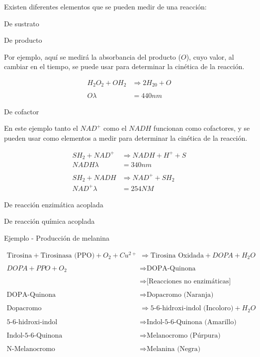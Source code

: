 Existen diferentes elementos que se pueden medir de una reacción:

De sustrato

De producto

Por ejemplo, aquí se medirá la absorbancia del producto ($O$), cuyo valor, al cambiar en el tiempo, se puede usar para determinar la cinética de la reacción.
 
\begin{align}
    H_2O_2 + OH_2 &\Longrightarrow 2H_20 + O
    \\
    \\
    O \lambda &= 440nm
\end{align}

De cofactor

En este ejemplo tanto el $NAD^+$ como el $NADH$ funcionan como cofactores, y se pueden usar como elementos a medir para determinar la cinética de la reacción.

\begin{align}
    SH_2 + NAD^{+} &\Longrightarrow NADH + H^{+} + S
    \\
    \hline
    NADH \lambda &= 340nm
    \\
    \\
    SH_2 + NADH &\Longrightarrow NAD^{+} + SH_2
    \\
    \hline
    NAD^{+} \lambda &= 254NM
\end{align}

De reacción enzimática acoplada

De reacción química acoplada

Ejemplo - Producción de melanina

\begin{align}
    \text{Tirosina} + \text{Tirosinasa (PPO)} + O_2 + Cu^{2+} &\Longrightarrow \text{Tirosina Oxidada} + DOPA + H_2O
    \\
    \\
    DOPA + PPO + O_2 &\Longrightarrow \text{DOPA-Quinona}
    \\
    \\
    &\Longrightarrow \text{[Reacciones no enzimáticas]}
    \\
    \\
    \text{DOPA-Quinona} &\Longrightarrow \text{Dopacromo (Naranja)}
    \\
    \\
    \text{Dopacromo} &\Longrightarrow \text{5-6-hidroxi-indol (Incoloro)} + H_2O
    \\
    \\
    \text{5-6-hidroxi-indol} &\Longrightarrow \text{Indol-5-6-Quinona (Amarillo)}
    \\
    \\
    \text{Indol-5-6-Quinona} &\Longrightarrow \text{Melanocromo (Púrpura)}
    \\
    \\
    \text{N-Melanocromo} &\Longrightarrow \text{Melanina (Negra)}
\end{align}

